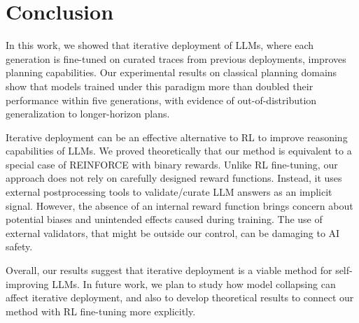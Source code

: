 \section{Conclusion}

In this work, we showed that iterative deployment of LLMs, where each generation
is fine-tuned on curated traces from previous deployments, improves planning
capabilities. Our experimental results on classical planning domains show that
models trained under this paradigm more than doubled their performance within
five generations, with evidence of out-of-distribution generalization to
longer-horizon plans.

Iterative deployment can be an effective alternative to RL to improve reasoning
capabilities of LLMs. We proved theoretically that our method is equivalent to a
special case of REINFORCE with binary rewards. Unlike RL fine-tuning, our
approach does not rely on carefully designed reward functions. Instead, it uses
external postprocessing tools to validate/curate LLM answers as an implicit
signal.  However, the absence of an internal reward function brings concern
about potential biases and unintended effects caused during training. The use of
external validators, that might be outside our control, can be damaging to AI
safety.

Overall, our results suggest that iterative deployment is a viable method for
self-improving LLMs. In future work, we plan to study how model collapsing
\citep{shumailov-et-al-nature2024} can affect iterative deployment, and also to
develop theoretical results to connect our method with RL fine-tuning more
explicitly.
